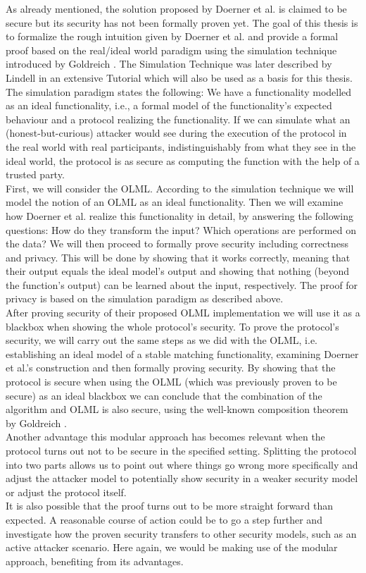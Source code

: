As already mentioned, the solution proposed by Doerner et al. \citep{smas} is claimed to be secure but its security has not been formally proven yet. The goal of this thesis is to formalize the rough intuition given by Doerner et al. and provide a formal proof based on the real/ideal world paradigm using the simulation technique introduced by Goldreich \citep{foc}. The Simulation Technique was later described by Lindell \citep{htsi} in an extensive Tutorial which will also be used as a basis for this thesis. The simulation paradigm states the following: We have a functionality modelled as an ideal functionality, i.e., a formal model of the functionality's expected behaviour and a protocol realizing the functionality. If we can simulate what an (honest-but-curious) attacker would see during the execution of the protocol in the real world with real participants, indistinguishably from what they see in the ideal world, the protocol is as secure as computing the function with the help of a trusted party.\\
First, we will consider the OLML. According to the simulation technique we will model the notion of an OLML as an ideal functionality. Then we will examine how Doerner et al. realize this functionality in detail, by answering the following questions: How do they transform the input? Which operations are performed on the data? We will then proceed to formally prove security including correctness and privacy. This will be done by showing that it works correctly, meaning that their output equals the ideal model's output and showing that nothing (beyond the function's output) can be learned about the input, respectively. The proof for privacy is based on the simulation paradigm as described above.\\
After proving security of their proposed OLML implementation we will use it as a blackbox when showing the whole protocol's security. To prove the protocol's security, we will carry out the same steps as we did with the OLML, i.e. establishing an ideal model of a stable matching functionality, examining Doerner et al.'s construction and then formally proving security. By showing that the protocol is secure when using the OLML (which was previously proven to be secure) as an ideal blackbox we can conclude that the combination of the algorithm and OLML is also secure, using the well-known composition theorem by Goldreich \citep{foc}.\\
Another advantage this modular approach has becomes relevant when the protocol turns out not to be secure in the specified setting. Splitting the protocol into two parts allows us to point out where things go wrong more specifically and adjust the attacker model to potentially show security in a weaker security model or adjust the protocol itself.\\
It is also possible that the proof turns out to be more straight forward than expected. A reasonable course of action could be to go a step further and investigate how the proven security transfers to other security models, such as an active attacker scenario. Here again, we would be making use of the modular approach, benefiting from its advantages.\\